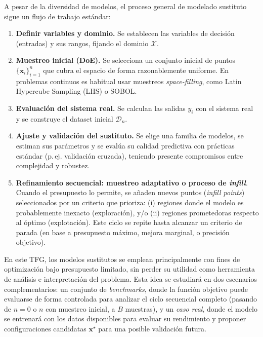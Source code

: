 \medskip
\noindent A pesar de la diversidad de modelos, el proceso general de modelado sustituto sigue un flujo de trabajo
estándar:
\begin{enumerate}
  \item \textbf{Definir variables y dominio.} Se establecen las variables de decisión (entradas)
  y sus rangos, fijando el dominio $\mathcal{X}$.
  \item \textbf{Muestreo inicial (DoE).} Se selecciona un conjunto inicial de puntos
  $\{\bm{x}_i\}_{i=1}^n$ que cubra el espacio de forma razonablemente uniforme. En problemas
  continuos es habitual usar muestreos \emph{space-filling}, como Latin Hypercube Sampling (LHS) o SOBOL.
  \cite{forrester2008engineering}
  \item \textbf{Evaluación del sistema real.} Se calculan las salidas $y_i$ con el sistema real
  y se construye el dataset inicial $\mathcal{D}_n$.
  \item \textbf{Ajuste y validación del sustituto.} Se elige una familia de modelos, se estiman sus
  parámetros y se evalúa su calidad predictiva con prácticas estándar (p.\,ej. validación cruzada),
  teniendo presente compromisos entre complejidad y robustez. \cite{forrester2008engineering}
  \item \textbf{Refinamiento secuencial: muestreo adaptativo o proceso de \emph{infill}}.
  Cuando el presupuesto lo permite, se añaden nuevos puntos (\emph{infill points}) seleccionados
  por un criterio que prioriza:
  (i) regiones donde el modelo es probablemente inexacto (exploración), y/o
  (ii) regiones prometedoras respecto al óptimo (explotación). Este ciclo se repite hasta alcanzar
  un criterio de parada (en base a presupuesto máximo, mejora marginal, o precisión objetivo). \cite{forrester2008engineering,jiang2020surrogate}
\end{enumerate}

\medskip
\noindent En este TFG, los modelos sustitutos se emplean principalmente con fines de optimización
bajo presupuesto limitado, sin perder su utilidad como herramienta de análisis e
interpretación del problema. Esta idea se estudiará en dos escenarios complementarios:
un conjunto de \emph{benchmarks}, donde la función objetivo puede evaluarse de forma
controlada para analizar el ciclo secuencial completo (pasando de $n=0$ o $n$ con muestreo inicial, a $B$ muestras), y un \emph{caso real}, donde el modelo
se entrenará con los datos disponibles para evaluar su rendimiento y proponer
configuraciones candidatas $\bm{x}^\star$ para una posible validación futura.

